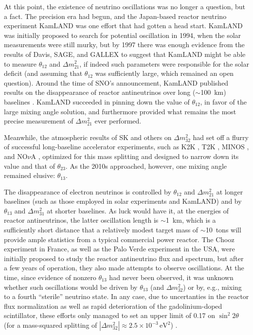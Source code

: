 \documentclass[../thesis.tex]{subfiles}
\begin{document}
At this point, the existence of neutrino oscillations was no longer a question, but a fact. The precision era had begun, and the Japan-based reactor neutrino experiment KamLAND was one effort that had gotten a head start. KamLAND was initially proposed to search for potential oscillation in 1994, when the solar measurements were still murky, but by 1997 there was enough evidence from the results of Davis, SAGE, and GALLEX to suggest that KamLAND might be able to measure $\theta_{12}$ and $\Delta m^2_{21}$, if indeed such parameters were responsible for the solar deficit (and assuming that $\theta_{12}$ was sufficiently large, which remained an open question). Around the time of SNO's announcement, KamLAND published results on the disappearance of reactor antineutrinos over long ($\sim$100~km) baselines \cite{PhysRevLett.90.021802}. KamLAND succeeded in pinning down the value of $\theta_{12}$, in favor of the large mixing angle solution, and furthermore provided what remains the most precise measurement of \(\Delta m^2_{21}\) ever performed.

Meanwhile, the atmospheric results of SK and others on \(\Delta m^2_{32}\) had set off a flurry of successful long-baseline accelerator experiments, such as K2K \cite{PhysRevD.74.072003}, T2K \cite{ABE2011106}, MINOS \cite{PhysRevLett.101.131802}, and NO$\nu$A \cite{PhysRevLett.123.151803}, optimized for this mass splitting and designed to narrow down its value and that of $\theta_{23}$. As the 2010s approached, however, one mixing angle remained elusive: $\theta_{13}$.

The disappearance of electron neutrinos is controlled by $\theta_{12}$ and \(\Delta m^2_{21}\) at longer baselines (such as those employed in solar experiments and KamLAND) and by $\theta_{13}$ and \(\Delta m^2_{31}\) at shorter baselines. As luck would have it, at the energies of reactor antineutrinos, the latter oscillation length is $\sim$1~km, which is a sufficiently short distance that a relatively modest target mass of $\sim$10~tons will provide ample statistics from a typical commercial power reactor. The Chooz experiment in France, as well as the Palo Verde experiment in the USA, were initially proposed to study the reactor antineutrino flux and spectrum, but after a few years of operation, they also made attempts to observe oscillations. At the time, since evidence of nonzero $\theta_{13}$ had never been observed, it was unknown whether such oscillations would be driven by $\theta_{13}$ (and $\Delta m^2_{32}$) or by, e.g., mixing to a fourth ``sterile'' neutrino state. In any case, due to uncertanties in the reactor flux normalization as well as rapid deterioration of the gadolinium-doped scintillator, these efforts only managed to set an upper limit of 0.17 on $\sin^2 2\theta$ (for a mass-squared splitting of $|\Delta m^2_{32}| \approx 2.5\times10^{-3}\,\text{eV}^2$) \cite{Apollonio_2003,PhysRevD.64.112001}.
\end{document}
